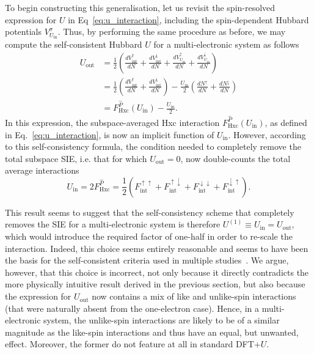 To begin constructing this generalisation, 
let us revisit the spin-resolved expression  
for $U$ in Eq~\eqref{eq:u_interaction}, 
including the spin-dependent 
Hubbard potentials $V_{U_\textrm{in}}^\sigma$.
%
Thus, 
by performing the same procedure as before, 
we may compute the self-consistent Hubbard $U$ 
for a multi-electronic system as follows 
%
\begin{align}
U_\textrm{out}&
=\frac{1}{2}\left(\frac{dV_\textrm{int}^\uparrow}{dN}+\frac{dV_\textrm{int}^\downarrow}{dN}+\frac{dV_{U_\textrm{in}}^\uparrow}{dN}+\frac{dV_{U_\textrm{in}}^\downarrow}{dN}\right)\nonumber \\[0.75em]
&=\frac{1}{2}\left(\frac{dV_\textrm{int}^\uparrow}{dN}+\frac{dV_\textrm{int}^\downarrow}{dN}\right)
-\frac{U_\textrm{in}}{2}\left(\frac{dN^\uparrow}{dN}+\frac{dN^\downarrow}{dN}\right)\nonumber \\[0.75em]
&=F_\textrm{Hxc}^{\hat{P}}(U_\textrm{in})-\frac{U_\textrm{in}}{2}. 
\label{eq:u_self_consistent_interaction1}
\end{align}
%
In this expression, 
the subspace-averaged Hxc interaction 
$F^{\hat{P}}_\textrm{Hxc} (U_\textrm{in})$, 
as defined in Eq.~\eqref{eq:u_interaction}, 
is now an implicit function of $U_\textrm{in}$.
%
However, 
according to this self-consistency formula, 
the condition needed to completely remove 
the total subspace SIE,
i.e. that for which $U_\textrm{out}=0$, 
now double-counts the total average interactions
%
\begin{equation}
U_\textrm{in}=2F_\textrm{Hxc}^{\hat{P}}
=\frac{1}{2}\left(F^{\uparrow\uparrow}_\textrm{int}
+F^{\uparrow\downarrow}_\textrm{int} +
F^{\downarrow\downarrow}_\textrm{int}
+F^{\downarrow\uparrow}_\textrm{int}\right).
\end{equation}
%

This result seems to suggest that the  
self-consistency scheme that 
completely removes the SIE for a
multi-electronic system is therefore 
$U^{(1)}\equiv U_\textrm{in}=U_\textrm{out}$, 
which would introduce the required factor 
of one-half in order to re-scale the interaction.
%
Indeed, 
this choice seems entirely reasonable 
and seems to have been the basis for the 
self-consistent criteria used in multiple 
studies~\cite{doi:10.1021/jp070549l,0953-8984-22-5-055602,PhysRevB.84.115108,PhysRevB.93.085135,PhysRevLett.106.118501,doi:10.1063/1.4947240}.
%
We argue, however, 
that this choice is incorrect, 
not only because it directly contradicts the 
more physically intuitive result derived in the previous section, 
but also because the expression for $U_\textrm{out}$ 
now contains a mix of like and unlike-spin interactions 
(that were naturally absent from the one-electron case).
%
{
Hence, in a multi-electronic system, 
the unlike-spin interactions are likely 
to be of a similar magnitude as the like-spin interactions 
and thus have an equal, but unwanted, effect.
%
Moreover, the former do not feature 
at all in standard DFT+$U$.}
%

